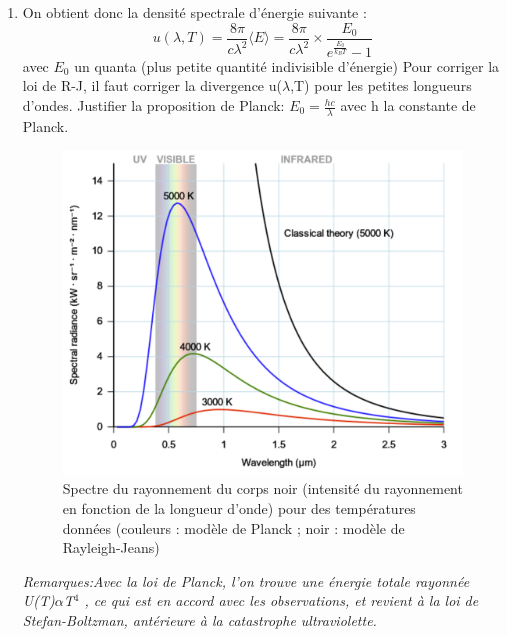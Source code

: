 \documentclass{article}
\begin{document}
\begin{enumerate}
    \item On obtient donc la densité spectrale d'énergie suivante :
\[ u(\lambda,T) = \frac{8\pi}{c\lambda^{2}} \langle E \rangle = \frac{8\pi}{c\lambda^{2}} \times \frac{E_{0}}{e^{\frac{E_{0}}{k_{B}T}}-1} \] avec $E_{0}$ un quanta (plus petite quantité indivisible d'énergie)\newline
Pour corriger la loi de R-J, il faut corriger la divergence u($\lambda$,T) pour les petites longueurs d'ondes.\newline
Justifier la proposition de Planck: $E_{0} = \frac{hc}{\lambda}$ avec h la constante de Planck.\newline
\begin{figure}[h]
    \centering
    \includegraphics[scale=0.7]{catastrophe_ultraviolette.png}
    \caption{Spectre du rayonnement du corps noir (intensité du rayonnement en fonction de la longueur d'onde) pour des températures données (couleurs : modèle de Planck ; noir : modèle de Rayleigh-Jeans)}
\end{figure}

\indent\textit{Remarques:}\textit{Avec la loi de Planck, l'on trouve une énergie totale rayonnée U(T)$\alpha$T$^{4}$ , ce qui est en accord avec les observations, et revient à la loi de Stefan-Boltzman, antérieure à la catastrophe ultraviolette.}
\end{enumerate}
\end{document}

